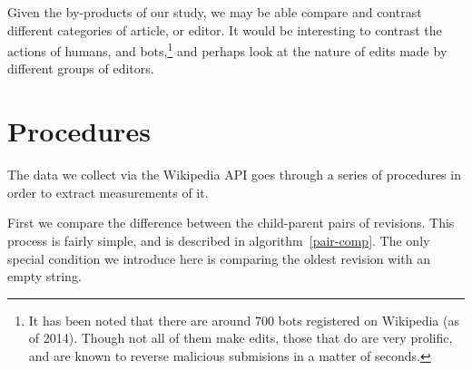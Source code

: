 Given the by-products of our study, we may be able compare and
contrast different categories of article, or editor. It would be
interesting to contrast the actions of humans, and bots,\footnote{It
  has been noted that there are around 700 bots registered on
  Wikipedia (as of 2014). Though not all of them make edits, those
  that do are very prolific, and are known to reverse malicious
  submisions in a matter of seconds.\cite{wiki-bots}\cite{bbc-bots}}
and perhaps look at the nature of edits made by different groups of
editors.

\section{Procedures}
The data we collect via the Wikipedia API goes through a series of
procedures in order to extract measurements of it.

First we compare the difference between the child-parent pairs of
revisions. This process is fairly simple, and is described in
algorithm~\ref{pair-comp}. The only special condition we introduce
here is comparing the oldest revision with an empty string.
